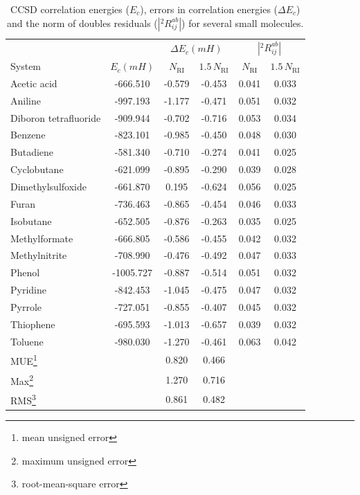 \begin{center}
\begin{table}[h]
\caption{CCSD correlation energies ($E_c$), errors in
correlation energies ($\Delta E_c$) 
and the norm of doubles residuals ($|{}^2R_{ij}^{ab}|$) for several small 
molecules.
\label{tab:energies}}
\begin{tabular}{lccccc}
\hline \hline
& & \multicolumn{2}{c}{$\Delta E_c (mH)$} & 
\multicolumn{2}{c}{$|{}^2R_{ij}^{ab}|$}\\
\cline{3-4} \cline{5-6} System & $E_c (mH)$ & $N_\mathrm{RI}$ &
$1.5 \, N_\mathrm{RI}$ & $N_\mathrm{RI}$ &
$1.5 \, N_\mathrm{RI}$\\
\hline
Acetic acid & -666.510 & -0.579 & -0.453 & 0.041 & 0.033 \\
Aniline & -997.193 & -1.177 & -0.471 & 0.051 & 0.032 \\
Diboron tetrafluoride & -909.944 & -0.702 & -0.716 & 0.053 & 0.034\\
Benzene & -823.101 & -0.985 & -0.450 & 0.048 & 0.030\\
Butadiene & -581.340 & -0.710 & -0.274 & 0.041 & 0.025\\
Cyclobutane & -621.099 & -0.895 & -0.290 & 0.039 & 0.028\\
Dimethylsulfoxide & -661.870 & 0.195 & -0.624 & 0.056 & 0.025\\
Furan & -736.463 & -0.865 & -0.454 & 0.046 & 0.033\\
Isobutane & -652.505 & -0.876 & -0.263 & 0.035 & 0.025\\
Methylformate & -666.805 & -0.586 & -0.455 & 0.042 & 0.032\\
Methylnitrite & -708.990 & -0.476 & -0.492 & 0.047 & 0.033\\
Phenol & -1005.727 & -0.887 & -0.514 & 0.051 & 0.032\\
Pyridine & -842.453 & -1.045 & -0.475 & 0.047 & 0.032\\
Pyrrole & -727.051 & -0.855 & -0.407 & 0.045 & 0.032\\
Thiophene & -695.593 & -1.013 & -0.657 & 0.039 & 0.032\\
Toluene & -980.030 & -1.270 & -0.461 & 0.063 & 0.042\\
\hline
MUE\footnote{mean unsigned error} & & 0.820 & 0.466 & &\\
Max\footnote{maximum unsigned error} & & 1.270 & 0.716 & &\\
RMS\footnote{root-mean-square error} & & 0.861 & 0.482 & &\\
\hline\hline
\end{tabular}
\end{table}

\end{center}
